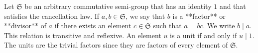 Let $\mathfrak{S}$ be an arbitrary commutative semi-group that has an identity $1$ and that satisfies the cancellation law. If $a, b \in \mathfrak{S}$, we say that $b$ is a **factor** or **divisor** of $a$ if there exists an element $c \in \mathfrak{S}$ such that $a = bc$. We write $b \mid a$. This relation is transitive and reflexive. An element $u$ is a unit if and only if $u \mid 1$. The units are the trivial factors since they are factors of every element of $\mathfrak{S}$.
